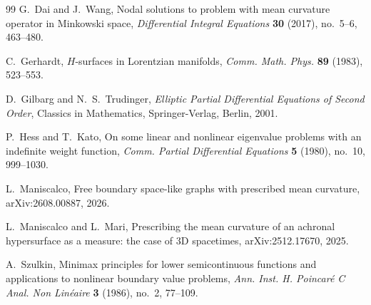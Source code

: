 \documentclass[11pt,reqno]{amsart}
\theoremstyle{plain}
\theoremstyle{definition}
\numberwithin{equation}{section}
\begin{document}
\begin{thebibliography}{99}
G.~Dai and J.~Wang,
Nodal solutions to problem with mean curvature operator in Minkowski space,
\emph{Differential Integral Equations} \textbf{30} (2017), no.~5--6, 463--480.

C.~Gerhardt,
$H$-surfaces in Lorentzian manifolds,
\emph{Comm. Math. Phys.} \textbf{89} (1983), 523--553.

D.~Gilbarg and N.~S.~Trudinger,
\emph{Elliptic Partial Differential Equations of Second Order},
Classics in Mathematics, Springer-Verlag, Berlin, 2001.

P.~Hess and T.~Kato,
On some linear and nonlinear eigenvalue problems with an indefinite weight function,
\emph{Comm. Partial Differential Equations} \textbf{5} (1980), no.~10, 999--1030.

L.~Maniscalco,
Free boundary space-like graphs with prescribed mean curvature,
arXiv:2608.00887, 2026.

L.~Maniscalco and L.~Mari,
Prescribing the mean curvature of an achronal hypersurface as a measure: the case of 3D spacetimes,
arXiv:2512.17670, 2025.

A.~Szulkin,
Minimax principles for lower semicontinuous functions and applications to nonlinear boundary value problems,
\emph{Ann. Inst. H. Poincar\'e C Anal. Non Lin\'eaire} \textbf{3} (1986), no.~2, 77--109.
\end{thebibliography}
\end{document}

